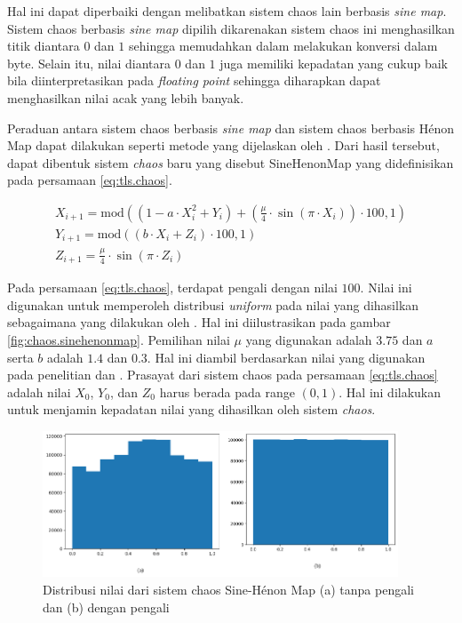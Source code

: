 Hal ini dapat diperbaiki dengan melibatkan sistem chaos lain berbasis \emph{sine map}. Sistem chaos berbasis \emph{sine map} dipilih dikarenakan sistem chaos ini menghasilkan titik diantara $0$ dan $1$ sehingga memudahkan dalam melakukan konversi dalam byte. Selain itu, nilai diantara $0$ dan $1$ juga memiliki kepadatan yang cukup baik bila diinterpretasikan pada \emph{floating point} sehingga diharapkan dapat menghasilkan nilai acak yang lebih banyak.

Peraduan antara sistem chaos berbasis \emph{sine map} dan sistem chaos berbasis Hénon Map dapat dilakukan seperti metode yang dijelaskan oleh \textcite{patel2021}. Dari hasil tersebut, dapat dibentuk sistem \emph{chaos} baru yang disebut SineHenonMap yang didefinisikan pada persamaan \ref{eq:tls.chaos}.

\begin{equation}
  \begin{aligned}
    X_{i+1} = \text{mod}((1 - a \cdot X_i^2 + Y_i) + (\frac{\mu}{4} \cdot \sin{(\pi \cdot X_{i})}) \cdot 100, 1)  \\
    Y_{i+1} = \text{mod}((b \cdot X_i + Z_{i}) \cdot 100, 1) \\
    Z_{i+1} = \frac{\mu}{4} \cdot \sin{(\pi \cdot Z_{i})}
  \end{aligned}
  \label{eq:tls.chaos}
\end{equation}

Pada persamaan \ref{eq:tls.chaos}, terdapat pengali dengan nilai $100$. Nilai ini digunakan untuk memperoleh distribusi \emph{uniform} pada nilai yang dihasilkan sebagaimana yang dilakukan oleh \textcite{nurhaliza2023}. Hal ini diilustrasikan pada gambar \ref{fig:chaos.sinehenonmap}. Pemilihan nilai $\mu$ yang digunakan adalah $3.75$ dan $a$ serta $b$ adalah $1.4$ dan $0.3$. Hal ini diambil berdasarkan nilai yang digunakan pada penelitian \textcite{lin2021} dan \textcite{patel2021}. Prasayat dari sistem chaos pada persamaan \ref{eq:tls.chaos} adalah nilai $X_0$, $Y_0$, dan $Z_0$ harus berada pada range $(0,1)$. Hal ini dilakukan untuk menjamin kepadatan nilai yang dihasilkan oleh sistem \emph{chaos}.

\begin{figure}[!h]
  \label{fig:chaos.sinehenonmap}
  \centering
  \includegraphics[width=400px]{chapters/res/chapter-3/img/sinehenon.distribution.png}
  \caption{Distribusi nilai dari sistem chaos Sine-Hénon Map (a) tanpa pengali dan (b) dengan pengali} \label{fig:chaos.henon.distribution}
\end{figure}

